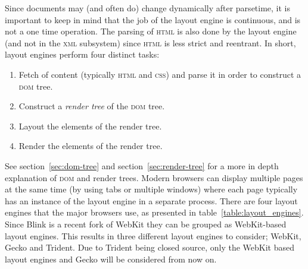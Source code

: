 \documentclass[a4paper,11pt]{kth-mag}
\begin{document}
      Since documents may (and often do) change dynamically after parsetime, it is important to keep in mind that the job of the layout engine is continuous, and is not a one time operation.
      The parsing of \textsc{html} is also done by the layout engine (and not in the \textsc{xml} subsystem) since \textsc{html} is less strict and reentrant.
      In short, layout engines perform four distinct tasks:
      \begin{enumerate}
        \item Fetch of content (typically \textsc{html} and \textsc{css}) and parse it in order to construct a \textsc{dom} tree.
        \item Construct a \emph{render tree} of the \textsc{dom} tree.
        \item Layout the elements of the render tree.
        \item Render the elements of the render tree.
      \end{enumerate}
      See section~\ref{sec:dom-tree} and section~\ref{sec:render-tree} for a more in depth explanation of \textsc{dom} and render trees.
      Modern browsers can display multiple pages at the same time (by using tabs or multiple windows) where each page typically has an instance of the layout engine in a separate process.
      There are four layout engines that the major browsers use, as presented in table~\ref{table:layout_engines}.
      Since Blink is a recent fork of WebKit they can be grouped as WebKit-based layout engines.
      This results in three different layout engines to consider; WebKit, Gecko and Trident.
      Due to Trident being closed source, only the WebKit based layout engines and Gecko will be considered from now on.
\end{document}
